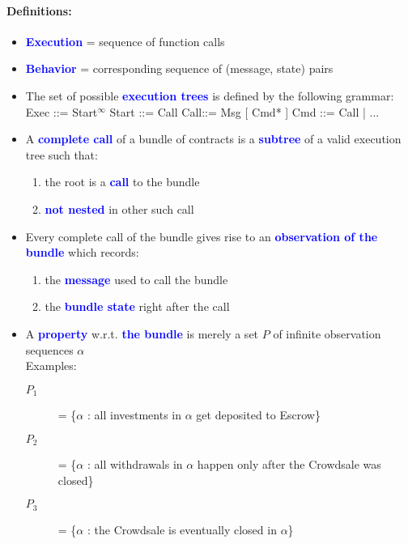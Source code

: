 \paragraph{Definitions:}
\begin{itemize}
    \item \textbf{\textcolor{blue}{Execution}} = sequence of function calls
    \item \textbf{\textcolor{blue}{Behavior}} =  corresponding sequence of (message, state) pairs
    \item The set of possible  \textbf{\textcolor{blue}{execution trees}} is defined by the following grammar:\\
    Exec ::= Start$^{\infty}$ \quad Start ::= Call \quad Call::= Msg [ Cmd* ] \quad Cmd ::= Call | ...
    \item A \textbf{\textcolor{blue}{complete call}} of a bundle of contracts is a \textbf{\textcolor{blue}{subtree}} of a valid execution tree such that:
    \begin{enumerate}
        \item the root is a \textbf{\textcolor{blue}{call}} to the bundle
        \item \textbf{\textcolor{blue}{not nested}} in other such call
    \end{enumerate}{}
    \item Every  complete call of the bundle gives rise to an \textbf{\textcolor{blue}{observation of the bundle}} which records:
    \begin{enumerate}
        \item the \textbf{\textcolor{blue}{message}} used  to call the bundle
        \item the \textbf{\textcolor{blue}{bundle state}} right after the call
    \end{enumerate}{}
    \item A \textbf{\textcolor{blue}{property}} w.r.t. \textbf{\textcolor{blue}{the bundle}} is merely a set \textbf{$P$} of infinite observation sequences $\alpha$\\
    Examples:
    \begin{description}
        \item[$P_1$] = \{$\alpha$ : all investments in $\alpha$ get deposited to Escrow\}
        \item[$P_2$] = \{$\alpha$ : all withdrawals in $\alpha$ happen only after the Crowdsale was closed\}
        \item[$P_3$] = \{$\alpha$ : the Crowdsale is eventually closed in $\alpha$\}
    \end{description}{}
\end{itemize}{}
